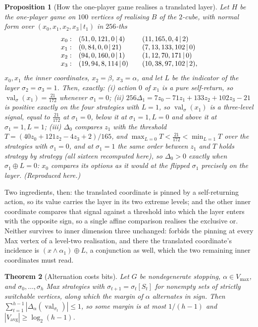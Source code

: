 \documentclass[11pt]{article}
\theoremstyle{plain}
\newtheorem{theorem}{Theorem}[section]
\newtheorem{proposition}[theorem]{Proposition}
\theoremstyle{definition}
\DeclareMathOperator{\val}{val}
\newcommand{\Vmax}{V_{\max}}
\newcommand{\Vavg}{V_{\mathrm{avg}}}
\begin{document}
\begin{proposition}[How the one-player game realises a translated layer]\label{prop:xor}
Let $H$ be the one-player game on $100$ vertices of
 realising $B$ of the $2$-cube, with normal form
over $(x_0,x_1,x_2,x_3\,|\,t_1)$ in $256$-ths
\[
 \begin{array}{r@{\quad}l@{\qquad}l}
  x_0: & (51,0,121,0\,|\,4) & (11,165,0,4\,|\,2)\\
  x_1: & (0,84,0,0\,|\,21) & (7,13,133,102\,|\,0)\\
  x_2: & (94,0,160,0\,|\,1) & (1,12,70,171\,|\,0)\\
  x_3: & (19,94,8,114\,|\,0) & (10,38,97,102\,|\,2),
 \end{array}
\]
$x_0,x_1$ the inner coordinates, $x_2=\beta$, $x_3=\alpha$, and let $L$
be the indicator of the layer $\sigma_2=\sigma_3=1$. Then, exactly:
(i) action $0$ of $x_1$ is a pure self-return, so
$\val_\sigma(x_1)=\tfrac{21}{172}$ whenever $\sigma_1=0$; (ii)
$256\Delta_1=7z_0-71z_1+133z_2+102z_3-21$ is positive exactly on the four
strategies with $L=1$, so $\val_\sigma(x_1)$ is a three-level signal,
equal to $\tfrac{21}{172}$ at $\sigma_1=0$, below it at $\sigma_1=1,L=0$
and above it at $\sigma_1=1,L=1$; (iii) $\Delta_0$ compares $z_1$ with
the threshold $T=(40z_0+121z_2-4z_3+2)/165$, and
$\max_{L=0}T<\tfrac{21}{172}<\min_{L=1}T$ over the strategies with
$\sigma_1=0$, and at $\sigma_1=1$ the same order between $z_1$ and $T$
holds strategy by strategy (all sixteen recomputed here), so $\Delta_0>0$
exactly when $\sigma_1\oplus L=0$: $x_0$ compares its options as it would at the
flipped $\sigma_1$ precisely on the layer. (Reproduced here.)
\end{proposition}

Two ingredients, then: the translated coordinate is pinned by a
self-returning action, so its value carries the layer in its two extreme
levels; and the other inner coordinate compares that signal against a
threshold into which the layer enters with the opposite sign, so a single
affine comparison realises the exclusive or. Neither survives to inner
dimension three unchanged:  forbids the pinning at every
Max vertex of a level-two realisation, and there the translated
coordinate's incidence is $(x\wedge\alpha_1)\oplus L$, a conjunction as
well, which the two remaining inner coordinates must read.

\begin{theorem}[Alternation costs bits]\label{thm:alternation-bits}
Let $G$ be nondegenerate stopping, $\alpha\in\Vmax$, and
$\sigma_0,\dots,\sigma_h$ Max strategies with $\sigma_{t+1}=\sigma_t[S_t]$
for nonempty sets of strictly switchable vertices, along which the margin
of $\alpha$ alternates in sign. Then
$\sum_{t=1}^{h-1}|\Delta_\alpha(\val_{\sigma_t})|\le1$, so some margin is
at most $1/(h-1)$ and $|\Vavg|\ge\log_2(h-1)$.
\end{theorem}
\end{document}
